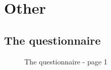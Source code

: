 \chapter{Other \label{chap:otherappendices}}

\section{The questionnaire \label{sec:appquestionnaire}}

\begin{figure}[h]
	\caption{The questionnaire - page 1}
\end{figure}

